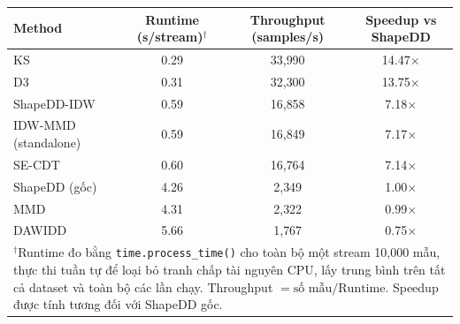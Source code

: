 \label{tab:runtime_stats}
\begin{tabular}{|l|c|c|c|}
\hline
\textbf{Method} & \textbf{Runtime (s/stream)$^\dagger$} & \textbf{Throughput (samples/s)} & \textbf{Speedup vs ShapeDD} \\
\hline
KS & 0.29 & 33{,}990 & 14.47$\times$ \\
D3 & 0.31 & 32{,}300 & 13.75$\times$ \\
ShapeDD-IDW & 0.59 & 16{,}858 & 7.18$\times$ \\
IDW-MMD (standalone) & 0.59 & 16{,}849 & 7.17$\times$ \\
SE-CDT & 0.60 & 16{,}764 & 7.14$\times$ \\
ShapeDD (gốc) & 4.26 & 2{,}349 & 1.00$\times$ \\
MMD & 4.31 & 2{,}322 & 0.99$\times$ \\
DAWIDD & 5.66 & 1{,}767 & 0.75$\times$ \\
\hline
\multicolumn{4}{|p{0.92\textwidth}|}{\footnotesize $^\dagger$Runtime đo bằng \texttt{time.process\_time()} cho toàn bộ một stream 10{,}000 mẫu, thực thi tuần tự để loại bỏ tranh chấp tài nguyên CPU, lấy trung bình trên tất cả dataset và toàn bộ các lần chạy. Throughput $= \text{số mẫu} / \text{Runtime}$. Speedup được tính tương đối với ShapeDD gốc.}\\
\hline
\end{tabular}

